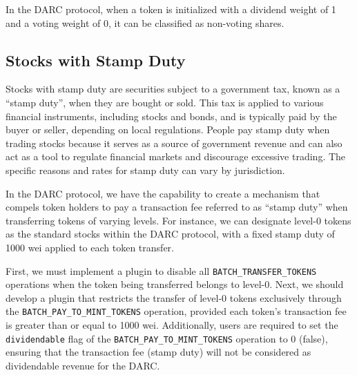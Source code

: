 \documentclass[main.tex]{subfiles}
\begin{document}
In the DARC protocol, when a token is initialized with a dividend weight of 1 and a voting weight of 0, it can be classified as non-voting shares.

\subsection{Stocks with Stamp Duty}

Stocks with stamp duty are securities subject to a government tax, known as a ``stamp duty'', when they are bought or sold. This tax is applied to various financial instruments, including stocks and bonds, and is typically paid by the buyer or seller, depending on local regulations. People pay stamp duty when trading stocks because it serves as a source of government revenue and can also act as a tool to regulate financial markets and discourage excessive trading. The specific reasons and rates for stamp duty can vary by jurisdiction.

In the DARC protocol, we have the capability to create a mechanism that compels token holders to pay a transaction fee referred to as ``stamp duty'' when transferring tokens of varying levels. For instance, we can designate level-0 tokens as the standard stocks within the DARC protocol, with a fixed stamp duty of 1000 wei applied to each token transfer.

First, we must implement a plugin to disable all \texttt{BATCH\_TRANSFER\_TOKENS} operations when the token being transferred belongs to level-0. Next, we should develop a plugin that restricts the transfer of level-0 tokens exclusively through the \texttt{BATCH\_PAY\_TO\_MINT\_TOKENS} operation, provided each token's transaction fee is greater than or equal to 1000 wei. Additionally, users are required to set the \texttt{dividendable} flag of the \texttt{BATCH\_PAY\_TO\_MINT\_TOKENS} operation to 0 (false), ensuring that the transaction fee (stamp duty) will not be considered as dividendable revenue for the DARC.
\end{document}
